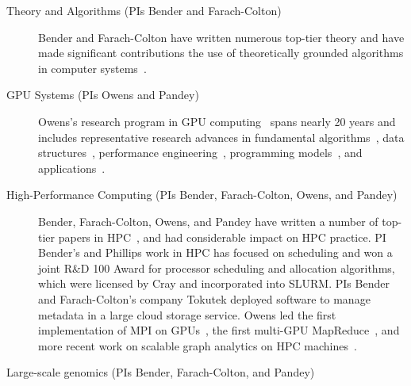 \begin{description}
  \item[Theory and Algorithms (PIs Bender and Farach-Colton)]
    Bender and Farach-Colton have written numerous
    top-tier theory and have made significant contributions the use of theoretically grounded algorithms in computer systems~\cite{BenderFaGo18,BenderFaJo12,BenderFaJo11,PandeyBeJo17,PandeyAlBe18,PandeyBeJo18,PandeyBeJo17c,DBLP:conf/icalp/ConwayFS18,betrfsmany,other}.


    \item[GPU Systems (PIs Owens and Pandey)] Owens's research program in GPU computing~\cite{Owens:2007:ASO,Owens:2008:GC} spans nearly 20 years and includes representative research advances in fundamental algorithms~\cite{Sengupta:2007:SPF}, data structures~\cite{Lefohn:2006:GGE,Alcantara:2009:RPH}, %
    performance engineering~\cite{Zhang:2011:AQP}, programming models~\cite{Gupta:2012:ASO, Tzeng:2010:TMF}, and applications~\cite{Wang:2017:GGG}.

    \item[High-Performance Computing (PIs Bender, Farach-Colton, Owens, and
        Pandey)] Bender, Farach-Colton, Owens, and Pandey have
      written a number of top-tier papers in HPC~\cite{pandey2020timely,bender2017two,eckstein2015pebbl,agrawal1989four,bender2008communication,greenberg1999enabling},
      and had considerable impact on HPC practice.   PI Bender's and Phillips 
      work in HPC has focused on scheduling and  won a joint R\&D 100 Award for
      processor scheduling and allocation algorithms, which were licensed by
      Cray and incorporated into SLURM\@.  PIs Bender and Farach-Colton's company
      Tokutek deployed software to manage metadata in a large cloud storage
      service. Owens led the first implementation of MPI on GPUs~\cite{Stuart:2009:MPO:withouturl,Stuart:2011:EMT}, the first multi-GPU MapReduce~\cite{Stuart:2011:MMO}, and more recent work on scalable graph analytics on HPC machines~\cite{Pan:2018:SBS,Pan:2017:MGA,Chen:2022:SIP}.

    \item[Large-scale genomics (PIs Bender, Farach-Colton, and Pandey)]

\end{description}


